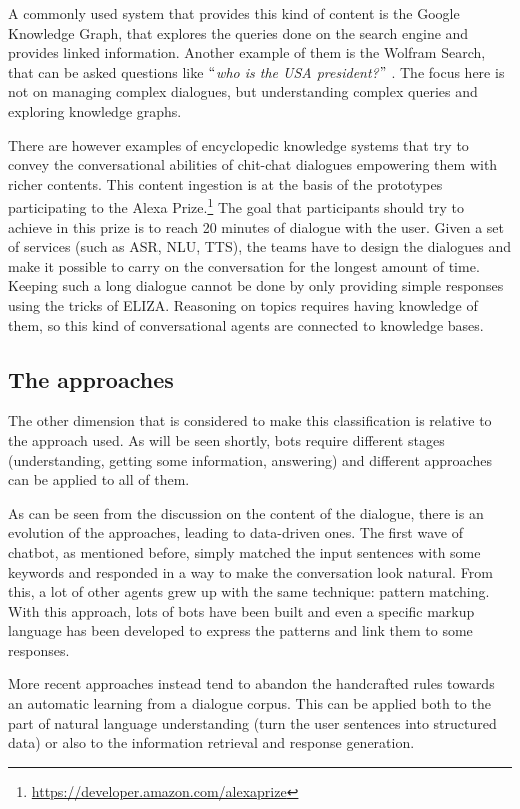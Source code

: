A commonly used system that provides this kind of content is the Google Knowledge Graph, that explores the queries done on the search engine and provides linked information. Another example of them is the Wolfram Search, that can be asked questions like $``$\textit{who is the USA president?}$"$ . The focus here is not on managing complex dialogues, but understanding complex queries and exploring knowledge graphs.

There are however examples of encyclopedic knowledge systems that try to convey the conversational abilities of chit-chat dialogues empowering them with richer contents. This content ingestion is at the basis of the prototypes participating to the Alexa Prize.\footnote{\url{https://developer.amazon.com/alexaprize}} The goal that participants should try to achieve in this prize is to reach 20 minutes of dialogue with the user. Given a set of services (such as ASR, NLU, TTS), the teams have to design the dialogues and make it possible to carry on the conversation for the longest amount of time. Keeping such a long dialogue cannot be done by only providing simple responses using the tricks of ELIZA. Reasoning on topics requires having knowledge of them, so this kind of conversational agents are connected to knowledge bases.

\subsection{The approaches}
\label{soaClassificationApproaches}

The other dimension that is considered to make this classification is relative to the approach used. As will be seen shortly, bots require different stages (understanding, getting some information, answering) and different approaches can be applied to all of them.

As can be seen from the discussion on the content of the dialogue, there is an evolution of the approaches, leading to data-driven ones. The first wave of chatbot, as mentioned before, simply matched the input sentences with some keywords and responded in a way to make the conversation look natural. From this, a lot of other agents grew up with the same technique: pattern matching. With this approach, lots of bots have been built and even a specific markup language has been developed to express the patterns and link them to some responses.

More recent approaches instead tend to abandon the handcrafted rules towards an automatic learning from a dialogue corpus. This can be applied both to the part of natural language understanding (turn the user sentences into structured data) or also to the information retrieval and response generation.

